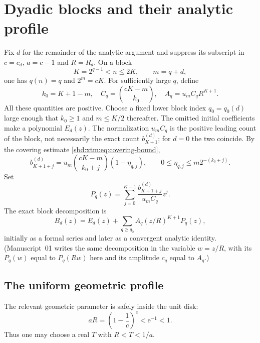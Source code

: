\documentclass[11pt,a4paper]{article}
\theoremstyle{definition}
\newcommand{\e}{\mathrm e}
\begin{document}
\section{Dyadic blocks and their analytic profile}
\label{sbd:xtm:sec:blocks}

Fix $d$ for the remainder of the analytic argument and suppress its
subscript in $c=c_d$, $a=c-1$ and $R=R_d$. On a block
\begin{equation}\label{sbd:xtm:eq:block-parameters}
 K=2^{q-1}<n\le2K,\qquad m=q+d,
\end{equation}
one has $q(n)=q$ and $2^m=cK$. For sufficiently large $q$, define
\begin{equation}\label{sbd:xtm:eq:amplitude-definition}
 k_0=K+1-m,\quad
 C_q=\binom{cK-m}{k_0},\quad
 A_q=u_mC_qR^{K+1}.
\end{equation}
All these quantities are positive. Choose a fixed lower block index
$q_0=q_0(d)$ large enough that $k_0\ge1$ and $m\le K/2$ thereafter.
The omitted initial coefficients make a polynomial $E_d(z)$. The
normalization $u_mC_q$ is the positive leading count of the block, not
necessarily the exact count $b_{K+1}^{(d)}$; for $d=0$ the two coincide.
By the covering estimate \eqref{sbd:xtm:eq:covering-bound},
\begin{equation}\label{sbd:edge:eq:eta}
 b_{K+1+j}^{(d)}=u_m\binom{cK-m}{k_0+j}(1-\eta_{q,j}),\qquad
 0\le\eta_{q,j}\le m2^{-(k_0+j)}.
\end{equation}
Set
\begin{equation}\label{sbd:xtm:eq:block-polynomial}
 P_q(z)=\sum_{j=0}^{K-1}
       \frac{b_{K+1+j}^{(d)}}{u_mC_q}z^j.
\end{equation}
The exact block decomposition is
\begin{equation}\label{sbd:xtm:eq:block-decomposition}
 B_d(z)=E_d(z)+\sum_{q\ge q_0}A_q(z/R)^{K+1}P_q(z),
\end{equation}
initially as a formal series and later as a convergent analytic identity.
(Manuscript~01 writes the same decomposition in the variable $w=z/R$, with
its $P_q(w)$ equal to $P_q(Rw)$ here and its amplitude $c_q$ equal to $A_q$.)

\subsection{The uniform geometric profile}
The relevant geometric parameter is safely inside the unit disk:
\begin{equation}\label{sbd:xtm:eq:margin}
 aR=\left(1-\frac1c\right)^c<\e^{-1}<1.
\end{equation}
Thus one may choose a real $T$ with $R<T<1/a$.
\end{document}
